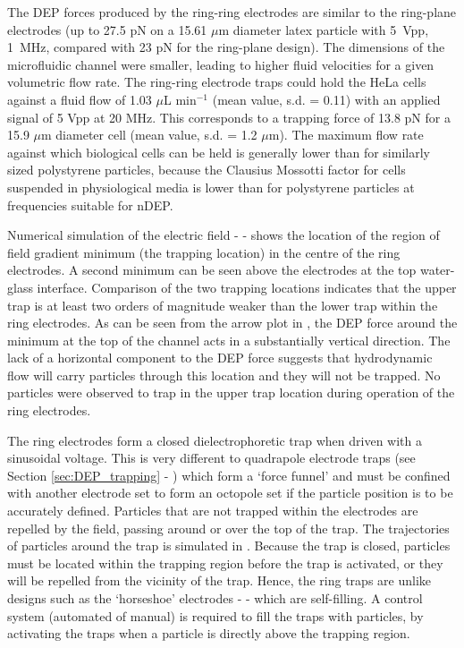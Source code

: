 The DEP forces produced by the ring-ring electrodes are similar to the ring-plane electrodes (up to 27.5 pN on a 15.61 $\mu$m diameter latex particle with 5~Vpp, 1~MHz, compared with 23 pN for the ring-plane design). The dimensions of the microfluidic channel were smaller, leading to higher fluid velocities for a given volumetric flow rate. The ring-ring electrode traps could hold the HeLa cells against a fluid flow of 1.03 $\mu$L min$^{-1}$ (mean value, s.d. = 0.11) with an applied signal of 5 Vpp at 20 MHz. This corresponds to a trapping force of 13.8 pN for a 15.9 $\mu$m diameter cell (mean value, s.d. = 1.2 $\mu$m). The maximum flow rate against which biological cells can be held is generally lower than for similarly sized polystyrene particles, because the Clausius Mossotti factor for cells suspended in physiological media is lower than for polystyrene particles at frequencies suitable for nDEP.

Numerical simulation of the electric field -  - shows the location of the region of field gradient minimum (the trapping location) in the centre of the ring electrodes. A second minimum can be seen above the electrodes at the top water-glass interface. Comparison of the two trapping locations indicates that the upper trap is at least two orders of magnitude weaker than the lower trap within the ring electrodes. As can be seen from the arrow plot in , the DEP force around the minimum at the top of the channel acts in a substantially vertical direction. The lack of a horizontal component to the DEP force suggests that hydrodynamic flow will carry particles through this location and they will not be trapped. No particles were observed to trap in the upper trap location during operation of the ring electrodes.

The ring electrodes form a closed dielectrophoretic trap when driven with a sinusoidal voltage. This is very different to quadrapole electrode traps (see Section \ref{sec:DEP_trapping} - ) which form a `force funnel' and must be confined with another electrode set to form an octopole set if the particle position is to be accurately defined. Particles that are not trapped within the electrodes are repelled by the field, passing around or over the top of the trap. The trajectories of particles around the trap is simulated in . Because the trap is closed, particles must be located within the trapping region before the trap is activated, or they will be repelled from the vicinity of the trap. Hence, the ring traps are unlike designs such as the `horseshoe' electrodes -  - which are self-filling. A control system (automated of manual) is required to fill the traps with particles, by activating the traps when a particle is directly above the trapping region. 

